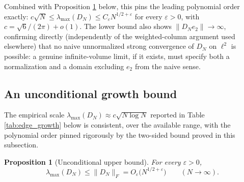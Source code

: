 \documentclass[11pt]{amsart}
\numberwithin{equation}{section}
\theoremstyle{plain}
\newtheorem{proposition}[theorem]{Proposition}
\theoremstyle{definition}
\theoremstyle{remark}
\newcommand{\eps}{\varepsilon}
\begin{document}
Combined with Proposition \ref{prop:frobenius_bound} below, this pins the leading polynomial order exactly: $c\sqrt N\le\lambda_{\max}(D_N)\le C_\eps N^{1/2+\eps}$ for every $\eps>0$, with $c=\sqrt6/(2\pi)+o(1)$.  The lower bound also shows $\|D_Ne_2\|\to\infty$, confirming directly (independently of the weighted-column argument used elsewhere) that no naive unnormalized strong convergence of $D_N$ on $\ell^2$ is possible: a genuine infinite-volume limit, if it exists, must specify both a normalization and a domain excluding $e_2$ from the naive sense.

\subsection{An unconditional growth bound}
\label{subsec:frobenius_bound}

The empirical scale $\lambda_{\max}(D_N)\approx c\sqrt{N\log N}$ reported in Table \ref{tab:edge_growth} below is consistent, over the available range, with the polynomial order pinned rigorously by the two-sided bound proved in this subsection.

\begin{proposition}[Unconditional upper bound]
\label{prop:frobenius_bound}
For every $\eps>0$,
\begin{equation}
\lambda_{\max}(D_N)\le\|D_N\|_F=O_\eps\bigl(N^{1/2+\eps}\bigr)
\qquad(N\to\infty).
\label{eq:frobenius_bound}
\end{equation}
\end{proposition}
\end{document}
